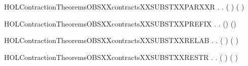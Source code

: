 \newcommand{\HOLContractionTheoremsOBSXXcontractsXXSUBSTXXPARXXL}{\UseVerbatim{HOLContractionTheoremsOBSXXcontractsXXSUBSTXXPARXXL}}
\begin{SaveVerbatim}{HOLContractionTheoremsOBSXXcontractsXXSUBSTXXPARXXR}
\HOLTokenTurnstile{} \HOLSymConst{\HOLTokenForall{}} .
          \HOLSymConst{\HOLTokenImp{}}
       \HOLSymConst{\HOLTokenForall{}}.  ( \HOLSymConst{\ensuremath{\parallel}} ) ( \HOLSymConst{\ensuremath{\parallel}} )
\end{SaveVerbatim}
\newcommand{\HOLContractionTheoremsOBSXXcontractsXXSUBSTXXPARXXR}{\UseVerbatim{HOLContractionTheoremsOBSXXcontractsXXSUBSTXXPARXXR}}
\begin{SaveVerbatim}{HOLContractionTheoremsOBSXXcontractsXXSUBSTXXPREFIX}
\HOLTokenTurnstile{} \HOLSymConst{\HOLTokenForall{}} .    \HOLSymConst{\HOLTokenImp{}} \HOLSymConst{\HOLTokenForall{}}.  () ()
\end{SaveVerbatim}
\newcommand{\HOLContractionTheoremsOBSXXcontractsXXSUBSTXXPREFIX}{\UseVerbatim{HOLContractionTheoremsOBSXXcontractsXXSUBSTXXPREFIX}}
\begin{SaveVerbatim}{HOLContractionTheoremsOBSXXcontractsXXSUBSTXXRELAB}
\HOLTokenTurnstile{} \HOLSymConst{\HOLTokenForall{}} .
          \HOLSymConst{\HOLTokenImp{}}
       \HOLSymConst{\HOLTokenForall{}}.  (  ) (  )
\end{SaveVerbatim}
\newcommand{\HOLContractionTheoremsOBSXXcontractsXXSUBSTXXRELAB}{\UseVerbatim{HOLContractionTheoremsOBSXXcontractsXXSUBSTXXRELAB}}
\begin{SaveVerbatim}{HOLContractionTheoremsOBSXXcontractsXXSUBSTXXRESTR}
\HOLTokenTurnstile{} \HOLSymConst{\HOLTokenForall{}} .
          \HOLSymConst{\HOLTokenImp{}} \HOLSymConst{\HOLTokenForall{}}.  (\HOLConst{\ensuremath{\nu}}  ) (\HOLConst{\ensuremath{\nu}}  )
\end{SaveVerbatim}
